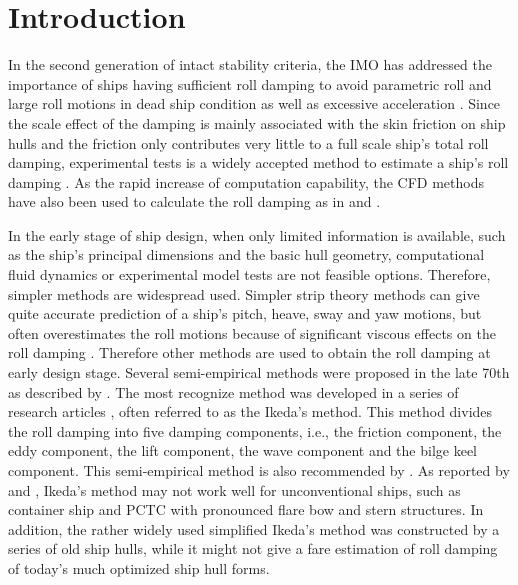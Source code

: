 \section{Introduction}
\label{se:introduction}

In the second generation of intact stability criteria, the IMO has addressed the importance of ships having sufficient roll damping to avoid parametric roll and large roll motions in dead ship condition as well as excessive acceleration \parencite{imo_finalization_2016}. 
Since the scale effect of the damping is mainly associated with the skin friction on ship hulls and the friction only contributes very little to a full scale ship's total roll damping, experimental tests is a widely accepted method to estimate a ship's roll damping \parencite{imo_1200_2006}. As the rapid increase of computation capability, the CFD methods have also been used to calculate the roll damping as in \parencite{kristiansen_experimental_2014} and \parencite{henry_peter_piehl_ship_2016}. 

In the early stage of ship design, when only limited information is available, such as the ship's principal dimensions and the basic hull geometry, computational fluid dynamics or experimental model tests are not feasible options.
Therefore, simpler methods are widespread used. Simpler strip theory methods can give quite accurate prediction of a ship's pitch, heave, sway and yaw motions, but often overestimates the roll motions because of significant viscous effects on the roll damping \parencite{kawahara_simple_2011}. Therefore other methods are used to obtain the roll damping at early design stage. Several semi-empirical methods were proposed in the late 70th as described by  \parencite{himeno_prediction_1981}. The most recognize method was developed in a series of research articles \parencite{ikeda_roll_1978,ikeda_eddy_1978,ikeda_roll_1979,ikeda_components_1978,ikeda_velocity_1979}, often referred to as the Ikeda's method. This method divides the roll damping into five damping components, i.e., the friction component, the eddy component, the lift component, the wave component and the bilge keel component. This semi-empirical method is also recommended by \parencite{ittc_ittc_2011}. As reported by  \parencite{kawahara_simple_2011} and \parencite{soder_ikeda_2019}, Ikeda's method may not work well for unconventional ships, such as container ship and PCTC with pronounced flare bow and stern structures. In addition, the rather widely used simplified Ikeda's method \parencite{kawahara_simple_2011} was constructed by a series of old ship hulls, while it might not give a fare estimation of roll damping of today's much optimized ship hull forms. 

